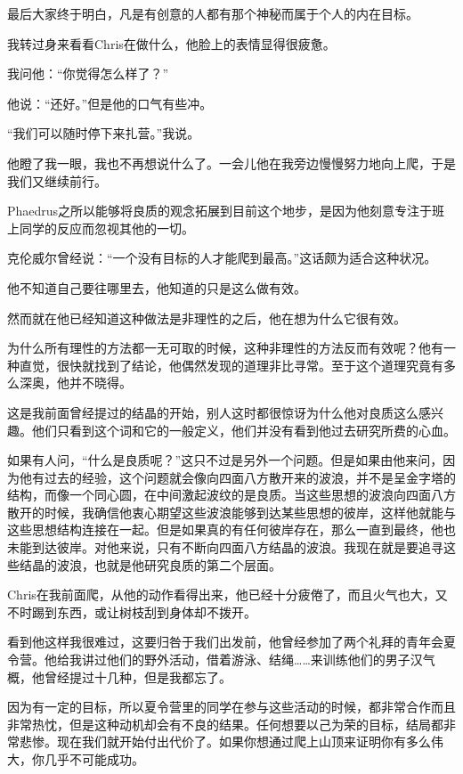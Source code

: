 \documentclass[UTF8]{article}
\begin{document}
\par 最后大家终于明白，凡是有创意的人都有那个神秘而属于个人的内在目标。
\par 我转过身来看看Chris在做什么，他脸上的表情显得很疲惫。
\par 我问他：“你觉得怎么样了？”
\par 他说：“还好。”但是他的口气有些冲。
\par “我们可以随时停下来扎营。”我说。
\par 他瞪了我一眼，我也不再想说什么了。一会儿他在我旁边慢慢努力地向上爬，于是我们又继续前行。
\par Phaedrus之所以能够将良质的观念拓展到目前这个地步，是因为他刻意专注于班上同学的反应而忽视其他的一切。
\par 克伦威尔曾经说：“一个没有目标的人才能爬到最高。”这话颇为适合这种状况。
\par 他不知道自己要往哪里去，他知道的只是这么做有效。
\par 然而就在他已经知道这种做法是非理性的之后，他在想为什么它很有效。
\par 为什么所有理性的方法都一无可取的时候，这种非理性的方法反而有效呢？他有一种直觉，很快就找到了结论，他偶然发现的道理非比寻常。至于这个道理究竟有多么深奥，他并不晓得。
\par 这是我前面曾经提过的结晶的开始，别人这时都很惊讶为什么他对良质这么感兴趣。他们只看到这个词和它的一般定义，他们并没有看到他过去研究所费的心血。
\par 如果有人问，“什么是良质呢？”这只不过是另外一个问题。但是如果由他来问，因为他有过去的经验，这个问题就会像向四面八方散开来的波浪，并不是呈金字塔的结构，而像一个同心圆，在中间激起波纹的是良质。当这些思想的波浪向四面八方散开的时候，我确信他衷心期望这些波浪能够到达某些思想的彼岸，这样他就能与这些思想结构连接在一起。但是如果真的有任何彼岸存在，那么一直到最终，他也未能到达彼岸。对他来说，只有不断向四面八方结晶的波浪。我现在就是要追寻这些结晶的波浪，也就是他研究良质的第二个层面。
\par Chris在我前面爬，从他的动作看得出来，他已经十分疲倦了，而且火气也大，又不时踢到东西，或让树枝刮到身体却不拨开。
\par 看到他这样我很难过，这要归咎于我们出发前，他曾经参加了两个礼拜的青年会夏令营。他给我讲过他们的野外活动，借着游泳、结绳……来训练他们的男子汉气概，他曾经提过十几种，但是我都忘了。
\par 因为有一定的目标，所以夏令营里的同学在参与这些活动的时候，都非常合作而且非常热忱，但是这种动机却会有不良的结果。任何想要以己为荣的目标，结局都非常悲惨。现在我们就开始付出代价了。如果你想通过爬上山顶来证明你有多么伟大，你几乎不可能成功。
\end{document}
